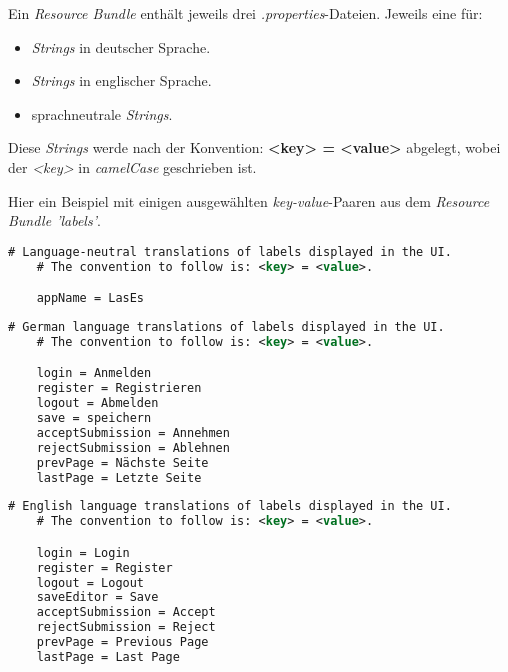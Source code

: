 Ein \emph{Resource Bundle} enthält jeweils drei \emph{.properties}-Dateien.
Jeweils eine für:
\begin{itemize}
    \item \emph{Strings} in deutscher Sprache.
    \item \emph{Strings} in englischer Sprache.
    \item sprachneutrale \emph{Strings}.
\end{itemize}

Diese \emph{Strings} werde nach der Konvention:
\textbf{<key> = <value>}
abgelegt, wobei der \emph{<key>} in \emph{camelCase} geschrieben ist.

Hier ein Beispiel mit einigen ausgewählten \emph{key-value}-Paaren aus
dem \emph{Resource Bundle 'labels'}.
\begin{lstlisting}[language=XML, caption = Beispielhafter Ausschnitt aus \emph{label.properties}]
    # Language-neutral translations of labels displayed in the UI.
    # The convention to follow is: <key> = <value>.

    appName = LasEs
\end{lstlisting}
\begin{lstlisting}[language=XML, caption = Beispielhafter Ausschnitt aus \emph{label\_de.properties}]
    # German language translations of labels displayed in the UI.
    # The convention to follow is: <key> = <value>.

    login = Anmelden
    register = Registrieren
    logout = Abmelden
    save = speichern
    acceptSubmission = Annehmen
    rejectSubmission = Ablehnen
    prevPage = Nächste Seite
    lastPage = Letzte Seite
\end{lstlisting}

\begin{lstlisting}[language=XML, caption = Beispielhafter Ausschnitt aus \emph{label\_en.properties}]
    # English language translations of labels displayed in the UI.
    # The convention to follow is: <key> = <value>.

    login = Login
    register = Register
    logout = Logout
    saveEditor = Save
    acceptSubmission = Accept
    rejectSubmission = Reject
    prevPage = Previous Page
    lastPage = Last Page
\end{lstlisting}